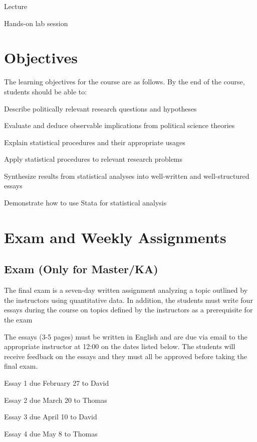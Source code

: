\documentclass[11pt,a4paper]{article}
\begin{document}
\begin{itemize*}
\item Lecture %
\item Hands-on lab session %
\end{itemize*}


\clearpage
\section{Objectives}
The learning objectives for the course are as follows. By the end of the course, students should be able to:

\begin{enumerate*}
\item Describe politically relevant research questions and hypotheses
\item Evaluate and deduce observable implications from political science theories 
\item Explain statistical procedures and their appropriate usages
\item Apply statistical procedures to relevant research problems
\item Synthesize results from statistical analyses into well-written and well-structured essays
\item Demonstrate how to use Stata for statistical analysis
\end{enumerate*}

\section{Exam and Weekly Assignments}

\subsection{Exam (Only for Master/KA)}
The final exam is a seven-day written assignment analyzing a topic outlined by the instructors using quantitative data. In addition, the students must write four essays during the course on topics defined by the instructors as a prerequisite for the exam

The essays (3-5 pages) must be written in English and are due via email to the appropriate instructor at 12:00 on the dates listed below. The students will receive feedback on the essays and they must all be approved before taking the final exam.

\begin{enumerate*}
\item Essay 1 due February 27 to David %
\item Essay 2 due March 20 to Thomas %
\item Essay 3 due April 10 to David %
\item Essay 4 due May 8 to Thomas %
\end{enumerate*}
\end{document}
